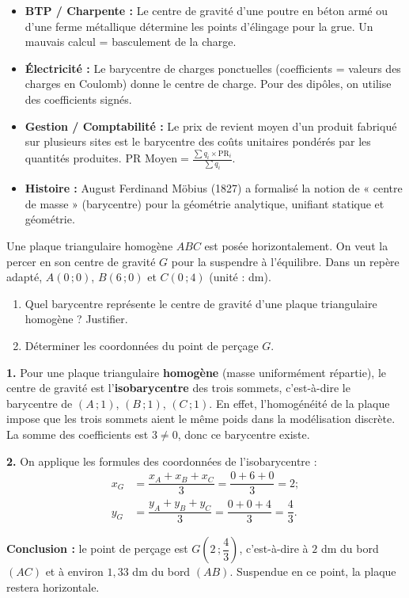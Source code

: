 \documentclass[11pt]{article}
\begin{document}
\begin{savaistu}
\begin{itemize}
\item \textbf{BTP / Charpente :} Le centre de gravité d'une poutre en béton armé ou d'une ferme métallique détermine les points d'élingage pour la grue. Un mauvais calcul = basculement de la charge.
\item \textbf{Électricité :} Le barycentre de charges ponctuelles (coefficients = valeurs des charges en Coulomb) donne le centre de charge. Pour des dipôles, on utilise des coefficients signés.
\item \textbf{Gestion / Comptabilité :} Le prix de revient moyen d'un produit fabriqué sur plusieurs sites est le barycentre des coûts unitaires pondérés par les quantités produites. $\text{PR Moyen} = \frac{\sum q_i \times \text{PR}_i}{\sum q_i}$.
\item \textbf{Histoire :} August Ferdinand Möbius (1827) a formalisé la notion de « centre de masse » (barycentre) pour la géométrie analytique, unifiant statique et géométrie.
\end{itemize}
\end{savaistu}

\begin{exoresolu}
Une plaque triangulaire homogène $ABC$ est posée horizontalement. On veut la percer en son centre de gravité $G$ pour la suspendre à l'équilibre. Dans un repère adapté, $A(0\,;0)$, $B(6\,;0)$ et $C(0\,;4)$ (unité : dm).
\begin{enumerate}
\item Quel barycentre représente le centre de gravité d'une plaque triangulaire homogène ? Justifier.
\item Déterminer les coordonnées du point de perçage $G$.
\end{enumerate}
\tcblower
\textbf{1.} Pour une plaque triangulaire \textbf{homogène} (masse uniformément répartie), le centre de gravité est l'\textbf{isobarycentre} des trois sommets, c'est-à-dire le barycentre de $(A\,;1)$, $(B\,;1)$, $(C\,;1)$. En effet, l'homogénéité de la plaque impose que les trois sommets aient le même poids dans la modélisation discrète. La somme des coefficients est $3\neq 0$, donc ce barycentre existe.

\textbf{2.} On applique les formules des coordonnées de l'isobarycentre :
\begin{align*}
x_G&=\dfrac{x_A+x_B+x_C}{3}=\dfrac{0+6+0}{3}=2 ;\\[4pt]
y_G&=\dfrac{y_A+y_B+y_C}{3}=\dfrac{0+0+4}{3}=\dfrac{4}{3}.
\end{align*}

\textbf{Conclusion :} le point de perçage est $G\left(2\,;\dfrac{4}{3}\right)$, c'est-à-dire à $2$ dm du bord $(AC)$ et à environ $1{,}33$ dm du bord $(AB)$. Suspendue en ce point, la plaque restera horizontale.
\end{exoresolu}
\end{document}
